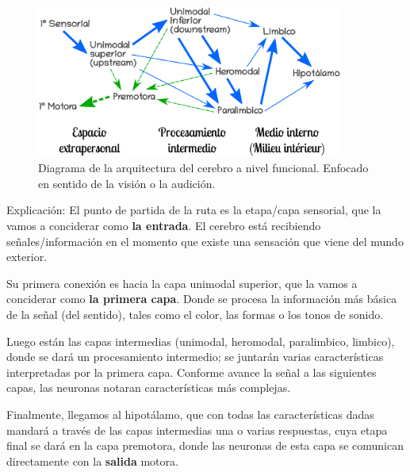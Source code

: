  \begin{figure}[h]
  \centering
  \includegraphics[width=0.9\textwidth]{../Figuras/zonasFuncionales.png}
  \caption{Diagrama de la arquitectura del cerebro a nivel funcional. Enfocado en sentido de la visión o la audición. \parencite{Mesulam1998}}
  \label{fig:zonasFun}
 \end{figure}

Explicación: El punto de partida de la ruta es la etapa/capa sensorial, que la vamos a conciderar como \textbf{la entrada}. El cerebro está recibiendo señales/información en el momento que existe una sensación que viene del mundo exterior.

Su primera conexión es hacia la capa unimodal superior, que la vamos a conciderar como \textbf{la primera capa}. Donde se procesa la información más básica de la señal (del sentido), tales como el color, las formas o los tonos de sonido.

Luego están las capas intermedias (unimodal, heromodal, paralimbico, limbico), donde se dará un procesamiento intermedio; se juntarán varias características interpretadas por la primera capa. Conforme avance la señal a las siguientes capas, las neuronas notaran características más complejas. 






Finalmente, llegamos al hipotálamo, que con todas las características dadas mandará a través de las capas intermedias una o varias respuestas, cuya etapa final se dará en la capa premotora, donde las neuronas de esta capa se comunican directamente con la \textbf{salida} motora.







